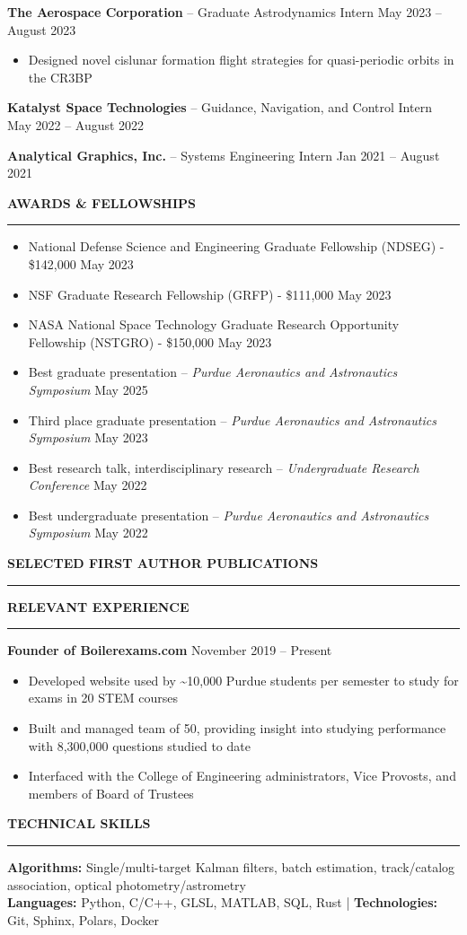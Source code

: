\documentclass[10pt, a4paper]{article}
\newcommand{\sectiontitle}[1]{{\Large \textbf{#1}}\vspace{0.5em}\hrule\vspace{0.5em}}
\begin{document}
\textbf{The Aerospace Corporation} -- Graduate Astrodynamics Intern \hfill May 2023 -- August 2023
\begin{itemize}[noitemsep]
    \item Designed novel cislunar formation flight strategies for quasi-periodic orbits in the CR3BP
\end{itemize}

\textbf{Katalyst Space Technologies} -- Guidance, Navigation, and Control Intern \hfill May 2022 -- August 2022
\vspace{3px}

\textbf{Analytical Graphics, Inc.} -- Systems Engineering Intern \hfill Jan 2021 -- August 2021
\vspace{7px}

\sectiontitle{AWARDS \& FELLOWSHIPS}
\begin{itemize}[noitemsep]
    \item National Defense Science and Engineering Graduate Fellowship (NDSEG) - \$142,000 \hfill May 2023
    \item NSF Graduate Research Fellowship (GRFP) - \$111,000 \hfill May 2023
    \item NASA National Space Technology Graduate Research Opportunity Fellowship (NSTGRO) - \$150,000 \hfill May 2023
    \item Best graduate presentation -- \textit{Purdue Aeronautics and Astronautics Symposium} \hfill May 2025
    \item Third place graduate presentation -- \textit{Purdue Aeronautics and Astronautics Symposium} \hfill May 2023
    \item Best research talk, interdisciplinary research -- \textit{Undergraduate Research Conference} \hfill May 2022
    \item Best undergraduate presentation -- \textit{Purdue Aeronautics and Astronautics Symposium} \hfill May 2022
\end{itemize}

\sectiontitle{SELECTED FIRST AUTHOR PUBLICATIONS}
\nocite{*}
\printbibliography[heading=none, sorting=ydnt]

\sectiontitle{RELEVANT EXPERIENCE}
\textbf{Founder of Boilerexams.com} \hfill November 2019 -- Present
\begin{itemize}[noitemsep]
    \item Developed website used by \textasciitilde10,000 Purdue students per semester to study for exams in 20 STEM courses
    \item Built and managed team of 50, providing insight into studying performance with 8,300,000 questions studied to date
    \item Interfaced with the College of Engineering administrators, Vice Provosts, and members of Board of Trustees
\end{itemize}

\sectiontitle{TECHNICAL SKILLS}
\textbf{Algorithms:} Single/multi-target Kalman filters, batch estimation, track/catalog association, optical photometry/astrometry \\
\textbf{Languages:} Python, C/C++, GLSL, MATLAB, SQL, Rust | \textbf{Technologies:} Git, Sphinx, Polars, Docker \\
\end{document}
